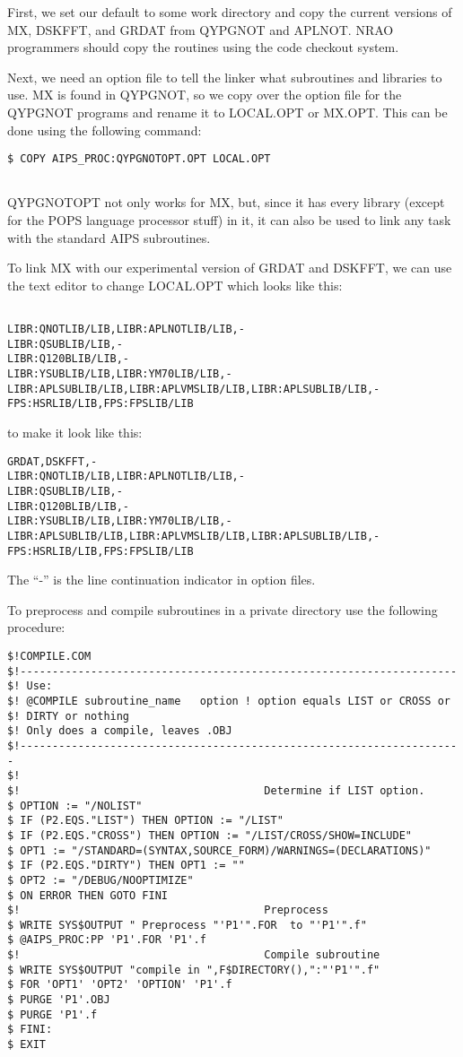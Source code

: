 First, we set our default to some work directory and copy the current
versions of MX, DSKFFT, and GRDAT from QYPGNOT and APLNOT.
NRAO programmers should copy the routines using the code checkout
system.

Next, we need an option file to tell the linker what subroutines and
libraries to use.  MX is found in QYPGNOT, so we copy over the option
file for the QYPGNOT programs and rename it to LOCAL.OPT or MX.OPT.
This can be done using the following command:

\begin{verbatim}
$ COPY AIPS_PROC:QYPGNOTOPT.OPT LOCAL.OPT


\end{verbatim}
QYPGNOTOPT not only works for MX, but, since it has every library
(except for the POPS language processor stuff) in it, it can also be
used to link any task with the standard AIPS subroutines.

To link MX with our experimental version of GRDAT and DSKFFT, we
can use the text editor to change LOCAL.OPT which looks like this:
\begin{verbatim}

LIBR:QNOTLIB/LIB,LIBR:APLNOTLIB/LIB,-
LIBR:QSUBLIB/LIB,-
LIBR:Q120BLIB/LIB,-
LIBR:YSUBLIB/LIB,LIBR:YM70LIB/LIB,-
LIBR:APLSUBLIB/LIB,LIBR:APLVMSLIB/LIB,LIBR:APLSUBLIB/LIB,-
FPS:HSRLIB/LIB,FPS:FPSLIB/LIB

\end{verbatim}
to make it look like this:

\begin{verbatim}
GRDAT,DSKFFT,-
LIBR:QNOTLIB/LIB,LIBR:APLNOTLIB/LIB,-
LIBR:QSUBLIB/LIB,-
LIBR:Q120BLIB/LIB,-
LIBR:YSUBLIB/LIB,LIBR:YM70LIB/LIB,-
LIBR:APLSUBLIB/LIB,LIBR:APLVMSLIB/LIB,LIBR:APLSUBLIB/LIB,-
FPS:HSRLIB/LIB,FPS:FPSLIB/LIB

\end{verbatim}
The ``-'' is the line continuation indicator in option files.


To preprocess and compile subroutines in a private directory use the
following procedure:
\begin{verbatim}
$!COMPILE.COM
$!--------------------------------------------------------------------
$! Use:
$! @COMPILE subroutine_name   option ! option equals LIST or CROSS or
$! DIRTY or nothing
$! Only does a compile, leaves .OBJ
$!---------------------------------------------------------------------
$!
$!                                      Determine if LIST option.
$ OPTION := "/NOLIST"
$ IF (P2.EQS."LIST") THEN OPTION := "/LIST"
$ IF (P2.EQS."CROSS") THEN OPTION := "/LIST/CROSS/SHOW=INCLUDE"
$ OPT1 := "/STANDARD=(SYNTAX,SOURCE_FORM)/WARNINGS=(DECLARATIONS)"
$ IF (P2.EQS."DIRTY") THEN OPT1 := ""
$ OPT2 := "/DEBUG/NOOPTIMIZE"
$ ON ERROR THEN GOTO FINI
$!                                      Preprocess
$ WRITE SYS$OUTPUT " Preprocess "'P1'".FOR  to "'P1'".f"
$ @AIPS_PROC:PP 'P1'.FOR 'P1'.f
$!                                      Compile subroutine
$ WRITE SYS$OUTPUT "compile in ",F$DIRECTORY(),":"'P1'".f"
$ FOR 'OPT1' 'OPT2' 'OPTION' 'P1'.f
$ PURGE 'P1'.OBJ
$ PURGE 'P1'.f
$ FINI:
$ EXIT


\end{verbatim}


